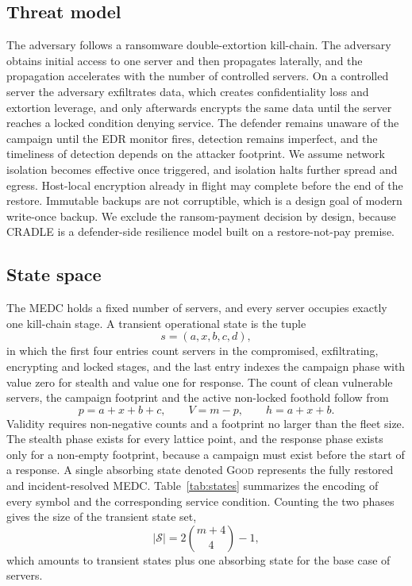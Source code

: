 \documentclass[journal]{IEEEtran}
\begin{document}
\subsection{Threat model}
The adversary follows a ransomware double-extortion kill-chain. The adversary
obtains initial access to one server and then propagates laterally, and the
propagation accelerates with the number of controlled servers. On a controlled
server the adversary exfiltrates data, which creates confidentiality loss and
extortion leverage, and only afterwards encrypts the same data until the server
reaches a locked condition denying service. The defender remains unaware of the
campaign until the EDR monitor fires, detection remains imperfect, and the
timeliness of detection depends on the attacker footprint. We assume network
isolation becomes effective once triggered, and isolation halts further spread
and egress. Host-local encryption already in flight may complete before the end
of the restore.
Immutable backups are not corruptible, which is a design goal of modern
write-once backup. We exclude the ransom-payment decision by design, because
CRADLE is a defender-side resilience model built on a restore-not-pay premise.

\subsection{State space}
The MEDC holds a fixed number of servers, and every server occupies exactly one
kill-chain stage. A transient operational state is the tuple
\begin{equation}
s=(a,x,b,c,d),
\end{equation}
in which the first four entries count servers in the compromised, exfiltrating,
encrypting and locked stages, and the last entry indexes the campaign phase with
value zero for stealth and value one for response. The count of clean vulnerable
servers, the campaign footprint and the active non-locked foothold follow from
\begin{equation}
p=a+x+b+c,\qquad V=m-p,\qquad h=a+x+b.
\label{eq:counts}
\end{equation}
Validity requires non-negative counts and a footprint no larger than the fleet
size. The stealth phase exists for every lattice point, and the response phase
exists only for a non-empty footprint, because a campaign must exist before the
start of a response. A single absorbing state denoted \textsc{Good} represents
the fully restored and incident-resolved MEDC.
Table~\ref{tab:states} summarizes the encoding of every symbol and the
corresponding service condition. Counting the two phases gives the size of the
transient state set,
\begin{equation}
|\mathcal{S}|=2\binom{m+4}{4}-1,
\label{eq:ssize}
\end{equation}
which amounts to \Cnt{} transient states plus one absorbing state for the base
case of \Cm{} servers.
\end{document}
